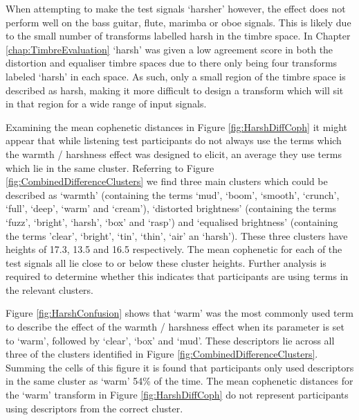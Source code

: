 			When attempting to make the test signals `harsher' however, the effect does not perform well on the
			bass guitar, flute, marimba or oboe signals. This is likely due to the small number of transforms
			labelled harsh in the timbre space. In Chapter \ref{chap:TimbreEvaluation} `harsh' was given a low
			agreement score in both the distortion and equaliser timbre spaces due to there only being four
			transforms labeled `harsh' in each space. As such, only a small region of the timbre space is
			described as harsh, making it more difficult to design a transform which will sit in that region
			for a wide range of input signals.
			
			Examining the mean cophenetic distances in Figure \ref{fig:HarshDiffCoph} it might appear that
			while listening test participants do not always use the terms which the warmth / harshness effect
			was designed to elicit, an average they use terms which lie in the same cluster. Referring to
			Figure \ref{fig:CombinedDifferenceClusters} we find three main clusters which could be described as
			`warmth' (containing the terms `mud', `boom', `smooth', `crunch', `full', `deep', `warm' and
			`cream'), `distorted brightness' (containing the terms `fuzz', `bright', `harsh', `box' and `rasp')
			and `equalised brightness' (containing the terms 'clear', `bright', `tin', `thin', `air' an
			`harsh'). These three clusters have heights of 17.3, 13.5 and 16.5 respectively. The mean
			cophenetic for each of the test signals all lie close to or below these cluster heights. Further
			analysis is required to determine whether this indicates that participants are using terms in the
			relevant clusters.

			Figure \ref{fig:HarshConfusion} shows that `warm' was the most commonly used term to describe the
			effect of the warmth / harshness effect when its parameter is set to `warm', followed by `clear',
			`box' and `mud'. These descriptors lie across all three of the clusters identified in Figure
			\ref{fig:CombinedDifferenceClusters}. Summing the cells of this figure it is found that
			participants only used descriptors in the same cluster as `warm' 54\% of the time. The mean
			cophenetic distances for the `warm' transform in Figure \ref{fig:HarshDiffCoph} do not represent
			participants using descriptors from the correct cluster.
			
